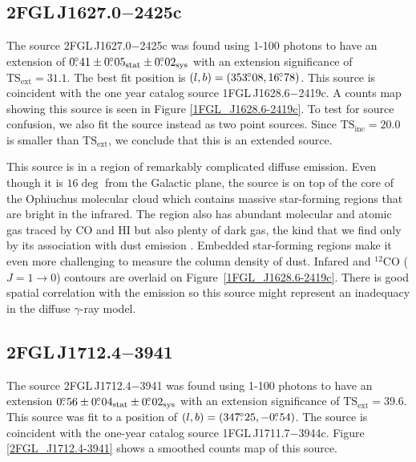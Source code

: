 \documentclass[12pt,preprint]{aastex}
\newcommand{\gev}{\text{GeV}\xspace}
\newcommand{\tsext}{{\ensuremath{\text{TS}_{\text{ext}}}}\xspace}
\newcommand{\tsinc}{\ensuremath{\text{TS}_{\text{inc}}}\xspace}
\newcommand{\sys}{\text{sys}\xspace}
\newcommand{\stat}{\text{stat}\xspace}
\newcommand{\hl}[1]{#1}
\begin{document}
\subsection{2FGL\,J1627.0$-$2425c}
\label{section_2FGL_J1627.0-2425c}


The source 2FGL\,J1627.0$-$2425c was found using 1-100 \gev photons to
have an extension of $0\fdg41\pm0\fdg05_\stat\pm0\fdg02_\sys$ with
an extension significance of $\tsext=31.1$.  The best fit position is
$(l,b)=(353\mbox{$.\!\!^\circ$}08, 16\mbox{$.\!\!^\circ$}78)$.  This source is coincident with the one
year catalog source 1FGL\,J1628.6$-$2419c.  A counts map showing this source
is seen in Figure \ref{1FGL_J1628.6-2419c}.  To test for source confusion,
we also fit the source instead as two point sources. Since $\tsinc=20.0$
is smaller than \tsext, we conclude that this is an extended source.

\hl{
This source is in a region of remarkably complicated diffuse emission.
Even though it is $16\deg$ from the Galactic plane, the source is on
top of the core of the Ophiuchus molecular cloud which contains massive
star-forming regions that are bright in the infrared.  The region also has
abundant molecular and atomic gas traced by CO and HI but also plenty of
dark gas, the kind that we find only by its association with dust emission
\citep{isabelle_dark_gass}. Embedded star-forming regions make it even
more challenging to measure the column density of dust.  Infared and 
${}^{12}\text{CO}$ ($J=1\rightarrow 0$)
contours are overlaid on Figure~\ref{1FGL_J1628.6-2419c}. There is good
spatial correlation with the \gev emission \citep{iras_rho_ophiuci,co_rho_ophiuci}
so this source might represent an inadequacy in the diffuse
$\gamma$-ray model.
}

\subsection{2FGL\,J1712.4$-$3941}
\label{section_2FGL_J1712.4-3941}


The source 2FGL\,J1712.4$-$3941 was found using 1-100 \gev
photons to have an extension $0\fdg56\pm0\fdg04_\stat\pm0\fdg02_\sys$
with an extension significance of $\tsext=39.6$.  This source was
fit to a position of $(l,b)=(347\mbox{$.\!\!^\circ$}25,-0\mbox{$.\!\!^\circ$}54)$.  The source
is coincident with the one-year catalog source 1FGL\,J1711.7$-$3944c.
Figure \ref{2FGL_J1712.4-3941} shows a smoothed counts map of this source.
\end{document}
